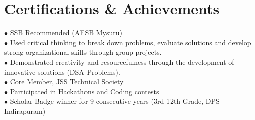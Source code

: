 \documentclass[letterpaper,10pt]{article}
\begin{document}
\section{Certifications \& Achievements}
  \begin{itemize}[leftmargin=0.15in, label={}]
    \small{\item{
                    $\bullet$ SSB Recommended (AFSB Mysuru) \\
              $\bullet$ Used critical thinking to break down problems, evaluate solutions and develop strong organizational skills through group projects. \\
              $\bullet$ Demonstrated creativity and resourcefulness through the development of innovative solutions (DSA Problems). \\
              $\bullet$ Core Member, JSS Technical Society \\
              $\bullet$ Participated in Hackathons and Coding contests \\
              $\bullet$ Scholar Badge winner for 9 consecutive years (3rd-12th Grade, DPS-Indirapuram) \\
          }}
  \end{itemize}
\end{document}
